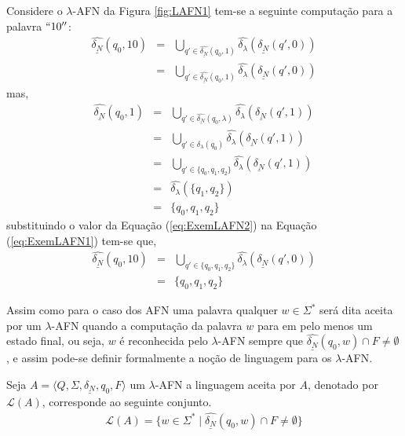 \begin{exem}
	Considere o $\lambda$-AFN da Figura \ref{fig:LAFN1} tem-se a seguinte computação para a palavra $``10''$:
	\begin{eqnarray}\label{eq:ExemLAFN1}
		\widehat{\underline{\delta_N}}(q_0, 10) & = & \bigcup_{q' \in \widehat{\underline{\delta_N}}(q_0, 1)} \widehat{\delta_\lambda}(\underline{\delta_N}(q', 0))\nonumber\\
		& = & \bigcup_{q' \in \widehat{\underline{\delta_N}}(q_0, 1)} \widehat{\delta_\lambda}(\underline{\delta_N}(q', 0))
	\end{eqnarray}
	mas,
	\begin{eqnarray}\label{eq:ExemLAFN2}
		\widehat{\underline{\delta_N}}(q_0, 1) & = & \bigcup_{q' \in \widehat{\underline{\delta_N}}(q_0, \lambda)} \widehat{\delta_\lambda}(\underline{\delta_N}(q', 1))\nonumber\\
		& = & \bigcup_{q' \in \delta_\lambda(q_0)} \widehat{\delta_\lambda}(\underline{\delta_N}(q', 1))\nonumber\\
		& = & \bigcup_{q' \in \{q_0, q_1, q_2\}} \widehat{\delta_\lambda}(\underline{\delta_N}(q', 1))\\
		& = & \widehat{\delta_\lambda}(\{q_1, q_2\})\nonumber\\
		& = & \{q_0, q_1, q_2\}\nonumber
	\end{eqnarray}
	substituindo o valor da Equação (\ref{eq:ExemLAFN2}) na Equação (\ref{eq:ExemLAFN1}) tem-se que, 
	\begin{eqnarray*}
		\widehat{\underline{\delta_N}}(q_0, 10) & = & \bigcup_{q' \in \{q_0, q_1, q_2\}} \widehat{\delta_\lambda}(\underline{\delta_N}(q', 0))\\
		& = & \{q_0, q_1, q_2\}
	\end{eqnarray*}
\end{exem}

Assim como para o caso dos AFN uma palavra qualquer $w \in \Sigma^*$ será dita aceita por um $\lambda$-AFN quando a computação da palavra $w$ para em pelo menos um estado final, ou seja, $w$ é reconhecida pelo $\lambda$-AFN sempre que $\widehat{\underline{\delta_N}}(q_0, w) \cap F \neq \emptyset$, e assim pode-se definir formalmente a noção de linguagem para os $\lambda$-AFN.

\begin{definition}\label{def:LinguagelLAFN}
	Seja $A = \langle Q, \Sigma, \underline{\delta_N}, q_0, F\rangle$ um $\lambda$-AFN a linguagem aceita por $A$, denotado por $\mathcal{L}(A)$, corresponde ao seguinte conjunto.
	\begin{eqnarray}
		\mathcal{L}(A) = \{w \in \Sigma^* \mid \widehat{\underline{\delta_N}}(q_0, w) \cap F \neq \emptyset\}
	\end{eqnarray}
\end{definition}

